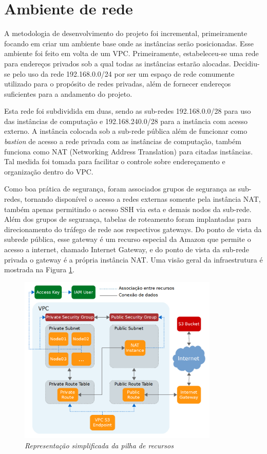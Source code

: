 \documentclass[tg]{mdtufsm}
\begin{document}
\section{Ambiente de rede}

A metodologia de desenvolvimento do projeto foi incremental, primeiramente focando em criar um ambiente base onde as instâncias serão posicionadas. Esse ambiente foi feito em volta de um VPC. Primeiramente, estabeleceu-se uma rede para endereços privados sob a qual todas as instâncias estarão alocadas. Decidiu-se pelo uso da rede 192.168.0.0/24 por ser um espaço de rede comumente utilizado para o propósito de redes privadas, além de fornecer endereços suficientes para a andamento do projeto.

Esta rede foi subdividida em duas, sendo as sub-redes 192.168.0.0/28 para uso das instâncias de computação e 192.168.240.0/28 para a instância com acesso externo. A instância colocada sob a sub-rede pública além de funcionar como \emph{bastion} de acesso a rede privada com as instâncias de computação, também funciona como NAT (Networking Address Translation) para citadas instâncias. Tal medida foi tomada para facilitar o controle sobre endereçamento e organização dentro do VPC.

Como boa prática de segurança, foram associados grupos de segurança as sub-redes, tornando disponível o acesso a redes externas somente pela instância NAT, também apenas permitindo o acesso SSH via esta e demais nodos da sub-rede. Além dos grupos de segurança, tabelas de roteamento foram implantadas para direcionamento do tráfego de rede aos respectivos gateways. Do ponto de vista da subrede pública, esse gateway é um recurso especial da Amazon que permite o acesso a internet, chamado Internet Gateway, e do ponto de vista da sub-rede privada o gateway é a própria instância NAT. Uma visão geral da infraestrutura é mostrada na Figura \ref{fig:myInfra}.

\begin{figure}
	\centering
	\includegraphics[width=0.85\textwidth]{simplified-infra}
	\caption{\emph{Representação simplificada da pilha de recursos}}
	\label{fig:myInfra}
\end{figure}
\end{document}
